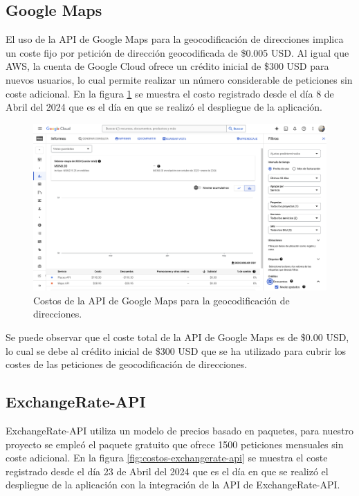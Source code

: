 \subsection{Google Maps}
El uso de la API de Google Maps para la geocodificación de direcciones implica
un coste fijo por petición de dirección geocodificada de \$0.005 USD. Al igual
que AWS, la cuenta de Google Cloud ofrece un crédito inicial de \$300 USD para
nuevos usuarios, lo cual permite realizar un número considerable de peticiones
sin coste adicional. En la figura \ref{fig:costos-google-maps} se muestra el
costo registrado desde el día 8 de Abril del 2024 que es el día en que se realizó
el despliegue de la aplicación.

\begin{figure}[H]
    \centering
    \includegraphics[width=1.0\textwidth]{imagenes/05-implementacion/costos/costos-google-maps.png}
    \caption{Costos de la API de Google Maps para la geocodificación de direcciones.}
    \label{fig:costos-google-maps}
\end{figure}

Se puede observar que el coste total de la API de Google Maps es de \$0.00 USD,
lo cual se debe al crédito inicial de \$300 USD que se ha utilizado para cubrir
los costes de las peticiones de geocodificación de direcciones.

\subsection{ExchangeRate-API}
ExchangeRate-API utiliza un modelo de precios basado en paquetes, para nuestro
proyecto se empleó el paquete gratuito que ofrece 1500 peticiones mensuales sin
coste adicional. En la figura \ref{fig:costos-exchangerate-api}
se muestra el coste registrado desde el día 23 de Abril del 2024 que es el día en
que se realizó el despliegue de la aplicación con la integración de la API de
ExchangeRate-API.

